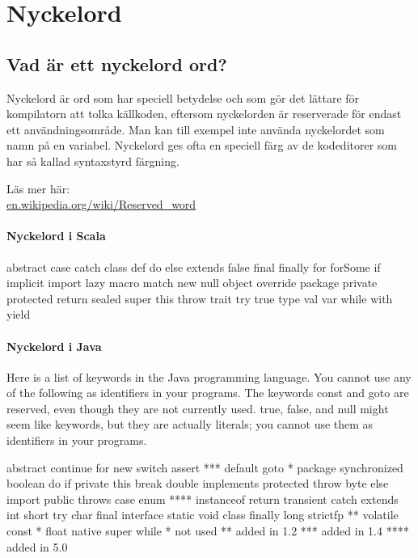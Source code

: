 
\chapter{Nyckelord}\label{appendix:keywords}

\section{Vad är ett nyckelord ord?}

Nyckelord är ord som har speciell betydelse och som gör det lättare för kompilatorn att tolka källkoden, eftersom nyckelorden är reserverade för endast ett användningsområde. Man kan till exempel inte använda nyckelordet  som namn på en variabel. Nyckelord ges ofta en speciell färg av de kodeditorer som har så kallad syntaxstyrd färgning.

Läs mer här:\\
\href{https://en.wikipedia.org/wiki/Reserved\_word}{en.wikipedia.org/wiki/Reserved\_word}
 
\subsubsection{Nyckelord i Scala}

\begin{Code}
abstract    case        catch       class       def
do          else        extends     false       final
finally     for         forSome     if          implicit
import      lazy        macro       match       new
null        object      override    package     private
protected   return      sealed      super       this
throw       trait       try         true        type
val         var         while       with        yield
\end{Code}


\subsubsection{Nyckelord i Java}

Here is a list of keywords in the Java programming language. You cannot use any of the following as identifiers in your programs. The keywords const and goto are reserved, even though they are not currently used. true, false, and null might seem like keywords, but they are actually literals; you cannot use them as identifiers in your programs.

\begin{Code}[language=Java]
abstract 	continue 	for 	new 	switch
assert *** 	default 	goto * 	package 	synchronized
boolean 	do 	if 	private 	this
break 	double 	implements 	protected 	throw
byte 	else 	import 	public 	throws
case 	enum **** 	instanceof 	return 	transient
catch 	extends 	int 	short 	try
char 	final 	interface 	static 	void
class 	finally 	long 	strictfp ** 	volatile
const * 	float 	native 	super 	while
* 	  	not used
** 	  	added in 1.2
*** 	  	added in 1.4
**** 	  	added in 5.0
\end{Code}


